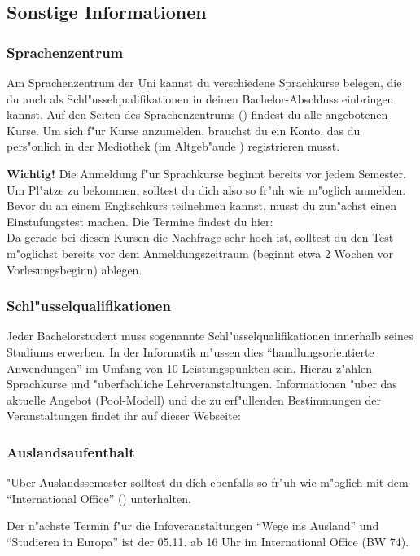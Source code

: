 \subsection{Sonstige Informationen}
\subsubsection{Sprachenzentrum}
Am Sprachenzentrum der Uni kannst du verschiedene Sprachkurse belegen, die du auch als Schl"usselqualifikationen in deinen Bachelor-Abschluss einbringen kannst.
Auf den Seiten des Sprachenzentrums () findest du alle angebotenen Kurse.
Um sich f"ur Kurse anzumelden, brauchst du ein Konto, das du pers"onlich in der Mediothek (im Altgeb"aude ) registrieren musst.

\textbf{Wichtig!} Die Anmeldung f"ur Sprachkurse beginnt bereits vor jedem Semester.
Um Pl"atze zu bekommen, solltest du dich also so fr"uh wie m"oglich anmelden.
Bevor du an einem Englischkurs teilnehmen kannst, musst du zun"achst einen Einstufungstest machen.
Die Termine findest du hier: \\
Da gerade bei diesen Kursen die Nachfrage sehr hoch ist, solltest du den Test m"oglichst bereits vor dem Anmeldungszeitraum (beginnt etwa 2 Wochen vor Vorlesungsbeginn) ablegen.

\subsubsection{Schl"usselqualifikationen}
Jeder Bachelorstudent muss sogenannte Schl"usselqualifikationen innerhalb seines Studiums erwerben.
In der Informatik m"ussen dies "`handlungsorientierte Anwendungen"' im Umfang von 10 Leistungspunkten sein.
Hierzu z"ahlen Sprachkurse und "uberfachliche Lehrveranstaltungen.
Informationen "uber das aktuelle Angebot (Pool-Modell) und die zu erf"ullenden Bestimmungen der Veranstaltungen findet ihr auf dieser Webseite: 

\newpage

\subsubsection{Auslandsaufenthalt}
"Uber Auslandssemester solltest du dich ebenfalls so fr"uh wie m"oglich mit dem "`International Office"' () unterhalten.

Der n"achste Termin f"ur die Infoveranstaltungen "`Wege ins Ausland"' und "`Studieren in Europa"' ist der 05.11. ab 16 Uhr im International Office (BW 74). 